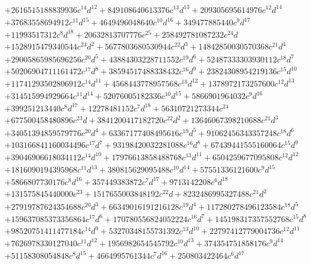 {\begin{align*}
&+2616515188839936c^{14}d^{12}+849108640613376c^{13}d^{13}+209305695614976c^{12}d^{14}\\
&+37683558694912c^{11}d^{15}+4649496048640c^{10}d^{16}+349477885440c^{9}d^{17}\\
&+11993517312c^{8}d^{18}+20632813707776c^{25}+258492781087232c^{24}d\\
&+1528915479340544c^{23}d^{2}+5677803680530944c^{22}d^{3}+14842850030570368c^{21}d^{4}\\
&+29005865985696256c^{20}d^{5}+43884303228711552c^{19}d^{6}+52487333303930112c^{18}d^{7}\\
&+50206904711161472c^{17}d^{8}+38594517488338432c^{16}d^{9}+23824308954219136c^{15}d^{10}\\
&+11741293502806912c^{14}d^{11}+4568443778957568c^{13}d^{12}+1378972173257600c^{12}d^{13}\\
&+314515994929664c^{11}d^{14}+52076005182336c^{10}d^{15}+5866901964032c^{9}d^{16}\\
&+399251213440c^{8}d^{17}+12278481152c^{7}d^{18}+56310721273344c^{24}\\
&+677500458480896c^{23}d+3841200417182720c^{22}d^{2}+13646067398210688c^{21}d^{3}\\
&+34051394859579776c^{20}d^{4}+63367177408495616c^{19}d^{5}+91062456343357248c^{18}d^{6}\\
&+103166841160034496c^{17}d^{7}+93198420032281088c^{16}d^{8}+67439441555160064c^{15}d^{9}\\
&+39046906618034112c^{14}d^{10}+17976613858488768c^{13}d^{11}+6504259677095808c^{12}d^{12}\\
&+1816090194395968c^{11}d^{13}+380815629095488c^{10}d^{14}+57551336121600c^{9}d^{15}\\
&+5866807730176c^{8}d^{16}+357449383872c^{7}d^{17}+9713142208c^{6}d^{18}\\
&+131575845440000c^{23}+1517655003848192c^{22}d+8232486995327488c^{21}d^{2}\\
&+27919787624354688c^{20}d^{3}+66349016191216128c^{19}d^{4}+117280278496123584c^{18}d^{5}\\
&+159637085373356864c^{17}d^{6}+170780556824052224c^{16}d^{7}+145198317357552768c^{15}d^{8}\\
&+98520751411477184c^{14}d^{9}+53270348155731392c^{13}d^{10}+22797412779004736c^{12}d^{11}\\
&+7626978330127040c^{11}d^{12}+1956982654545792c^{10}d^{13}+374354751858176c^{9}d^{14}\\
&+51158308054848c^{8}d^{15}+4664995761344c^{7}d^{16}+250803422464c^{6}d^{17}\\

\end{align*}}
